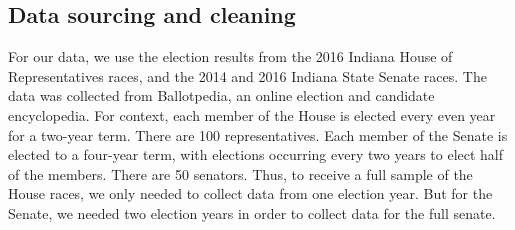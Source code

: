 \documentclass[sigconf]{acmart}
\begin{document}
\subsection{Data sourcing and cleaning}

For our data, we use the election results from the 2016 Indiana House of Representatives races\cite{houseresults}, and the 2014 and 2016 Indiana State Senate races\cite{senateresults2014}\cite{senateresults2016}. The data was collected from Ballotpedia, an online election and candidate encyclopedia. For context, each member of the House is elected every even year for a two-year term. There are 100 representatives. Each member of the Senate is elected to a four-year term, with elections occurring every two years to elect half of the members. There are 50 senators. Thus, to receive a full sample of the House races, we only needed to collect data from one election year. But for the Senate, we needed two election years in order to collect data for the full senate.
\end{document}
